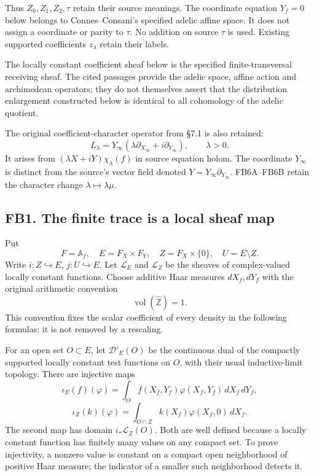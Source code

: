 Thus \(Z_0,Z_1,Z_2,\tau\) retain their source meanings. The coordinate
equation \(Y_f=0\) below belongs to Connes--Consani's specified adelic
affine space. It does not assign a coordinate or parity to \(\tau\). No
addition on source \(\tau\) is used. Existing supported coefficients
\(z_\lambda\) retain their labels.

The locally constant coefficient sheaf below is the specified
finite-transversal receiving sheaf. The cited passages provide the
adelic space, affine action and archimedean operators; they do not
themselves assert that the distribution enlargement constructed below is
identical to all cohomology of the adelic quotient.

The original coefficient-character operator from §7.1 is also retained:
\[
L_\lambda=Y_\infty(\lambda\partial_{X_\infty}+i\partial_{Y_\infty}),
\qquad \lambda>0.
\tag{FB0.2}
\] It arises from \((\lambda X+iY)\chi_\lambda(f)\) in source equation
holom. The coordinate \(Y_\infty\) is distinct from the source's vector
field denoted \(Y=Y_\infty\partial_{Y_\infty}\). FB6A--FB6B retain the
character change \(\lambda\mapsto\lambda\mu\).

\subsection{FB1. The finite trace is a local sheaf
map}\label{fb1.-the-finite-trace-is-a-local-sheaf-map}

Put \[
F=\mathbb A_f,\quad E=F_X\times F_Y,\quad
Z=F_X\times\{0\},\quad U=E\setminus Z.
\] Write \(i:Z\hookrightarrow E\), \(j:U\hookrightarrow E\). Let
\(\mathscr L_E\) and \(\mathscr L_Z\) be the sheaves of complex-valued
locally constant functions. Choose additive Haar measures \(dX_f,dY_f\)
with the original arithmetic convention \[
\operatorname{vol}(\widehat{\mathbb Z})=1.
\tag{FB1.1}
\] This convention fixes the scalar coefficient of every density in the
following formulas; it is not removed by a rescaling.

For an open set \(O\subset E\), let \(\mathscr D'_E(O)\) be the
continuous dual of the compactly supported locally constant test
functions on \(O\), with their usual inductive-limit topology. There are
injective maps \[
\iota_E(f)(\varphi)=
\int_O f(X_f,Y_f)\varphi(X_f,Y_f)\,dX_f\,dY_f,
\] \[
\iota_Z(k)(\varphi)=
\int_{O\cap Z}k(X_f)\varphi(X_f,0)\,dX_f.
\tag{FB1.2}
\] The second map has domain \(i_*\mathscr L_Z(O)\). Both are well
defined because a locally constant function has finitely many values on
any compact set. To prove injectivity, a nonzero value is constant on a
compact open neighborhood of positive Haar measure; the indicator of a
smaller such neighborhood detects it.

